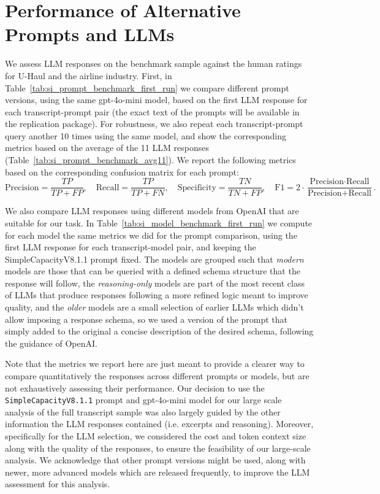 \section{Performance of Alternative Prompts and LLMs}\label{sec:app_prompt_comparison}

We assess LLM responses on the benchmark sample against the human ratings for U-Haul and the airline industry. First, in Table~\ref{tab:si_prompt_benchmark_first_run} we compare different prompt versions, using the same gpt-4o-mini model, based on the first LLM response for each transcript-prompt pair (the exact text of the prompts will be available in the replication package). For robustness, we also repeat each transcript-prompt query another 10 times using the same model, and show the corresponding metrics based on the average of the 11 LLM responses (Table~\ref{tab:si_prompt_benchmark_avg11}). We report the following metrics based on the corresponding confusion matrix for each prompt:
\begingroup
\scriptsize
\[
\text{Precision}=\frac{TP}{TP+FP},\quad \text{Recall}=\frac{TP}{TP+FN},\quad \text{Specificity}=\frac{TN}{TN+FP},\quad \text{F1}=2\cdot\frac{\text{Precision}\cdot\text{Recall}}{\text{Precision}+\text{Recall}}.
\]
\endgroup

We also compare LLM responses using different models from OpenAI that are suitable for our task. In Table~\ref{tab:si_model_benchmark_first_run} we compute for each model the same metrics we did for the prompt comparison, using the first LLM response for each transcript-model pair, and keeping the SimpleCapacityV8.1.1 prompt fixed. The models are grouped such that \textit{modern} models are those that can be queried with a defined schema structure that the response will follow, the \textit{reasoning-only} models are part of the most recent class of LLMs that produce responses following a more refined logic meant to improve quality, and the \textit{older} models are a small selection of earlier LLMs which didn't allow imposing a response schema, so we used a version of the prompt that simply added to the original a concise description of the desired schema, following the guidance of OpenAI.

Note that the metrics we report here are just meant to provide a clearer way to compare quantitatively the responses across different prompts or models, but are not exhaustively assessing their performance. Our decision to use the \texttt{SimpleCapacityV8.1.1} prompt and gpt-4o-mini model for our large scale analysis of the full transcript sample was also largely guided by the other information the LLM responses contained (i.e. excerpts and reasoning). Moreover, specifically for the LLM selection, we considered the cost and token context size along with the quality of the responses, to ensure the feasibility of our large-scale analysis. We acknowledge that other prompt versions might be used, along with newer, more advanced models which are released frequently, to improve the LLM assessment for this analysis.

